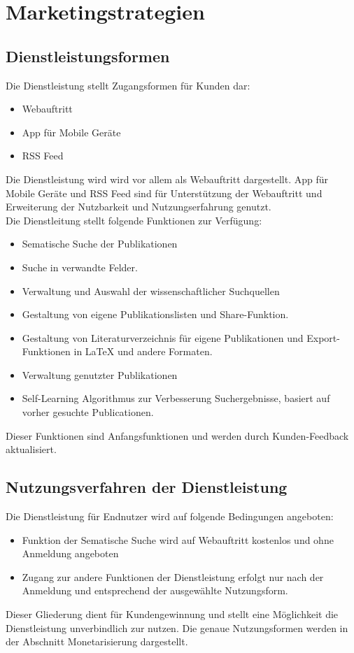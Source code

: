 \section{Marketingstrategien}



\subsection{Dienstleistungsformen}

Die Dienstleistung stellt Zugangsformen für Kunden dar:
\begin{itemize}
\item Webauftritt
\item App für Mobile Geräte
\item RSS Feed
\end{itemize}

Die Dienstleistung wird wird vor allem als Webauftritt dargestellt. App für Mobile Geräte und RSS Feed sind für Unterstützung der Webauftritt und Erweiterung der Nutzbarkeit und Nutzungserfahrung genutzt.\\

Die Dienstleitung stellt folgende Funktionen zur Verfügung:
\begin{itemize}
\item Sematische Suche der Publikationen
\item Suche in verwandte Felder. 
\item Verwaltung und Auswahl der wissenschaftlicher Suchquellen
\item Gestaltung von eigene Publikationslisten und Share-Funktion.
\item Gestaltung von Literaturverzeichnis für eigene Publikationen und Export-Funktionen in {\LaTeX} und andere Formaten. 
\item Verwaltung genutzter Publikationen
\item Self-Learning Algorithmus zur Verbesserung Suchergebnisse, basiert auf vorher gesuchte Publicationen.
\end{itemize}

Dieser Funktionen sind Anfangsfunktionen und werden durch Kunden-Feedback aktualisiert. 

\subsection{Nutzungsverfahren der Dienstleistung}
Die Dienstleistung für Endnutzer wird auf folgende Bedingungen angeboten:
\begin{itemize}
\item Funktion der Sematische Suche wird auf Webauftritt kostenlos und ohne Anmeldung angeboten
\item Zugang zur andere Funktionen der Dienstleistung erfolgt nur nach der Anmeldung und entsprechend der ausgewählte Nutzungsform. 
\end{itemize}
Dieser Gliederung dient für Kundengewinnung und stellt eine Möglichkeit die Dienstleistung unverbindlich zur nutzen. Die genaue Nutzungsformen werden in der Abschnitt Monetarisierung dargestellt. 

